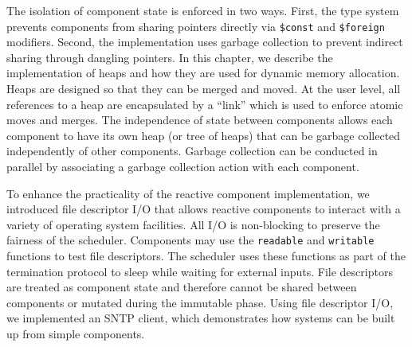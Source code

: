 The isolation of component state is enforced in two ways.
First, the type system prevents components from sharing pointers directly via \verb+$const+ and \verb+$foreign+ modifiers.
Second, the implementation uses garbage collection to prevent indirect sharing through dangling pointers.
In this chapter, we describe the implementation of heaps and how they are used for dynamic memory allocation.
Heaps are designed so that they can be merged and moved.
At the user level, all references to a heap are encapsulated by a ``link'' which is used to enforce atomic moves and merges.
The independence of state between components allows each component to have its own heap (or tree of heaps) that can be garbage collected independently of other components.
Garbage collection can be conducted in parallel by associating a garbage collection action with each component.

To enhance the practicality of the reactive component implementation, we introduced file descriptor I/O that allows reactive components to interact with a variety of operating system facilities.
All I/O is non-blocking to preserve the fairness of the scheduler.
Components may use the \verb+readable+ and \verb+writable+ functions to test file descriptors.
The scheduler uses these functions as part of the termination protocol to sleep while waiting for external inputs.
File descriptors are treated as component state and therefore cannot be shared between components or mutated during the immutable phase.
Using file descriptor I/O, we implemented an SNTP client, which demonstrates how systems can be built up from simple components.
